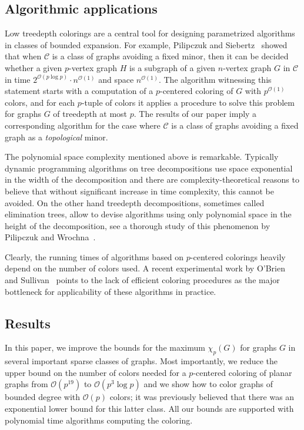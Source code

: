 \documentclass[11pt]{article}
\begin{document}
\subsection{Algorithmic applications}
Low treedepth colorings are a central tool for designing parametrized algorithms 
in classes of bounded expansion.
For example, Pilipczuk and Siebertz~\cite{PS19} showed that when $\mathcal{C}$ 
is a class of graphs avoiding a fixed minor,
then it can be decided whether a given $p$-vertex graph $H$ is a subgraph of a given $n$-vertex
graph $G$ in $\mathcal{C}$ in time $2^{\mathcal{O}(p\log p)}\cdot n^{\mathcal{O}(1)}$ and space $n^{\mathcal{O}(1)}$.
The algorithm witnessing this statement starts with a computation 
of a $p$-centered coloring of $G$ with $p^{\mathcal{O}(1)}$ colors, and 
for each $p$-tuple of colors it applies a procedure 
to solve this problem for graphs $G$ of treedepth at most $p$.
The results of our paper imply a corresponding algorithm for the case where
$\mathcal{C}$ is a class of graphs avoiding a fixed graph 
as a \emph{topological} minor.

The polynomial space complexity mentioned above is remarkable.  Typically
dynamic programming algorithms on tree decompositions use space exponential in
the width of the decomposition and there are complexity-theoretical reasons to
believe that without significant increase in time complexity, this cannot be
avoided.  On the other hand treedepth decompositions, sometimes called
elimination trees, allow to devise algorithms using only polynomial space in
the height of the decomposition, see a thorough study of this phenomenon by
Pilipczuk and Wrochna~\cite{PW18}.

Clearly, the running times of algorithms based on $p$-centered colorings 
heavily depend on the number of colors used.
A recent experimental work by O’Brien and Sullivan~\cite{BS17}
points to the lack of efficient coloring procedures
as the major bottleneck for applicability of these algorithms in practice.

\subsection{Results} In this paper, we improve the bounds for the maximum
$\chi_p(G)$ for graphs $G$ in several important sparse classes of graphs.
Most importantly, we reduce the upper bound on the number of colors needed for
a $p$-centered coloring of planar graphs from $\mathcal{O}(p^{19})$ to
$\mathcal{O}(p^3\log p)$ and we show how to color graphs of bounded degree with
$\mathcal{O}(p)$ colors; it was previously believed that there was an exponential
lower bound for this latter class.  All our bounds are supported with
polynomial time algorithms computing the coloring.
\end{document}

